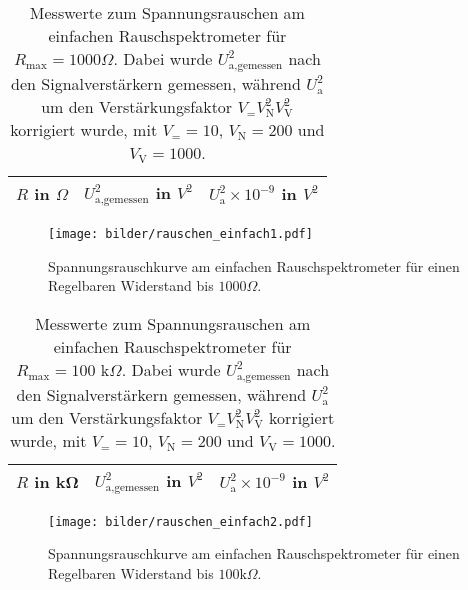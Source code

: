 \begin{table}[h]
			\centering
			\begin{tabular}{ccc}
				\toprule \midrule
				$R$ in $\Omega$ & $U_\text{a,gemessen}^2$ in $V^2$ 
				& $U_\text{a}^2 \times 10^{-9}$ in $V^2$ \\
				\midrule
				
				\midrule \bottomrule
			\end{tabular}
			\caption{Messwerte zum Spannungsrauschen am einfachen
			Rauschspektrometer für $R_\text{max}=1000 \Omega$. 
			Dabei wurde $U_\text{a,gemessen}^2$ nach den Signalverstärkern gemessen, während 
			$U_\text{a}^2$ um den Verstärkungsfaktor $V_= V_\text{N}^2 V_\text{V}^2$ korrigiert 
			wurde, mit $V_= 
			=10$, $V_\text{N}=200$ und $V_\text{V}=1000$.}
			\label{tab:rauschen_einfach1}
\end{table}
\begin{figure}[h]
			\centering
			\texttt{[image: bilder/rauschen\_einfach1.pdf]}
			\caption{Spannungsrauschkurve am einfachen Rauschspektrometer für einen
			Regelbaren Widerstand bis $1000\Omega$.}
			\label{fig:rauschen_einfach1}
	\end{figure}




	\begin{table}[h]
			\centering
			\begin{tabular}{ccc}
				\toprule \midrule
				$R$ in \si{\kilo\ohm} & $U_\text{a,gemessen}^2$ in $V^2$ 
				& $U_\text{a}^2 \times 10^{-9}$ in $V^2$\\
				\midrule
				
				\midrule \bottomrule
			\end{tabular}
			\caption{Messwerte zum Spannungsrauschen am einfachen
			Rauschspektrometer für $R_\text{max}=100 \text{ k}\Omega$. 
			Dabei wurde $U_\text{a,gemessen}^2$ nach den Signalverstärkern gemessen, während 
			$U_\text{a}^2$ um den Verstärkungsfaktor $V_= V_\text{N}^2 V_\text{V}^2$ korrigiert 
			wurde, mit $V_= 
			=10$, $V_\text{N}=200$ und $V_\text{V}=1000$.}
			\label{tab:rauschen_einfach2}
	\end{table}
	\begin{figure}[h]
			\centering
			\texttt{[image: bilder/rauschen\_einfach2.pdf]}
			\caption{Spannungsrauschkurve am einfachen Rauschspektrometer für einen
			Regelbaren Widerstand bis $100\text{k}\Omega$.}
			\label{fig:rauschen_einfach2}

	\end{figure}


